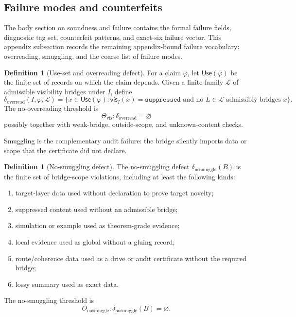 \documentclass[11pt]{article}
\theoremstyle{definition}
\newtheorem{definition}[theorem]{Definition}
\begin{document}
\subsection{Failure modes and counterfeits}
\label{appsubsec:definitions-failure-modes-counterfeits}

The body section on soundness and failure contains the formal failure fields,
diagnostic tag set, counterfeit patterns, and exact-six failure vector.  This
appendix subsection records the remaining appendix-bound failure vocabulary:
overreading, smuggling, and the coarse list of failure modes.

\begin{definition}[Use-set and overreading defect]
\label{def:sau-overread}
For a claim \(\varphi\), let \(\mathsf{Use}(\varphi)\) be the finite set of records on which the claim depends. Given a finite family \(\mathcal L\) of admissible visibility bridges under \(I\), define
\[
\delta_{\mathrm{overread}}(I,\varphi,\mathcal L)
=
\{x\in\mathsf{Use}(\varphi):\mathsf{vis}_I(x)=\texttt{suppressed}
\text{ and no }L\in\mathcal L\text{ admissibly bridges }x\}.
\]
The no-overreading threshold is
\[
\Theta_{\mathrm{vis}}:\delta_{\mathrm{overread}}=\varnothing
\]
possibly together with weak-bridge, outside-scope, and unknown-content checks.
\end{definition}

Smuggling is the complementary audit failure: the bridge silently imports data
or scope that the certificate did not declare.

\begin{definition}[No-smuggling defect]
\label{def:sau-nosmuggling}
The no-smuggling defect \(\delta_{\mathrm{nosmuggle}}(B)\) is the finite set of bridge-scope violations, including at least the following kinds:
\begin{enumerate}
\item target-layer data used without declaration to prove target novelty;
\item suppressed content used without an admissible bridge;
\item simulation or example used as theorem-grade evidence;
\item local evidence used as global without a gluing record;
\item route/coherence data used as a drive or audit certificate without the required bridge;
\item lossy summary used as exact data.
\end{enumerate}
The no-smuggling threshold is
\[
\Theta_{\mathrm{nosmuggle}}:\delta_{\mathrm{nosmuggle}}(B)=\varnothing.
\]
\end{definition}
\end{document}
